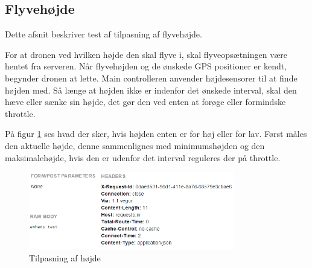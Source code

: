 \subsection{Flyvehøjde}

Dette afsnit beskriver test af tilpasning af flyvehøjde.

For at dronen ved hvilken højde den skal flyve i, skal flyveopsætningen være hentet fra serveren. Når flyvehøjden og de ønskede GPS positioner er kendt, begynder dronen at lette. Main controlleren anvender højdesensorer til at finde højden med. Så længe at højden ikke er indenfor det ønskede interval, skal den hæve eller sænke sin højde, det gør den ved enten at forøge eller formindske throttle. 

På figur \ref{fig:skift_hoejde} ses hvad der sker, hvis højden enten er for høj eller for lav. Først måles den aktuelle højde, denne sammenlignes med minimumshøjden og den maksimalehøjde, hvis den er udenfor det interval reguleres der på throttle. 

\begin{figure}[H]
\centering
\includegraphics[width=0.8\textwidth]{Billeder/Test/put_request.png}
\caption{Tilpasning af højde}
\label{fig:skift_hoejde}
\end{figure}